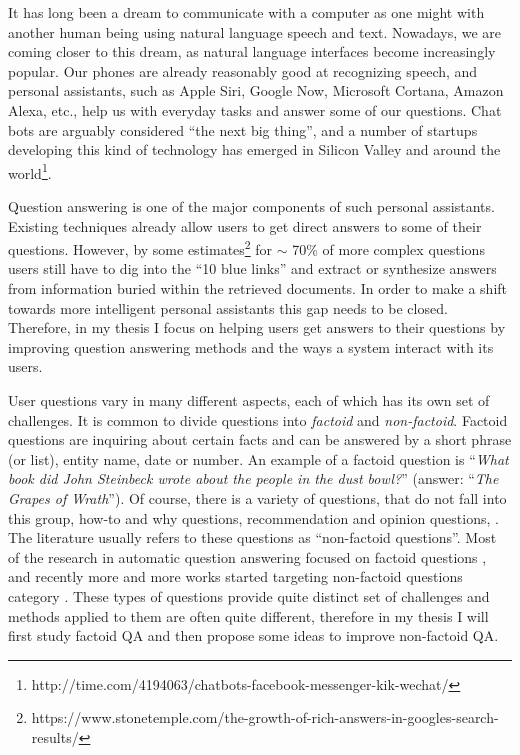 %
%
\label{chapter:intro}

\setcounter{page}{1}
\pagestyle{myheadings}

\noindent

It has long been a dream to communicate with a computer as one might with another human being using natural language speech and text.
Nowadays, we are coming closer to this dream, as natural language interfaces become increasingly popular.
Our phones are already reasonably good at recognizing speech, and personal assistants, such as Apple Siri, Google Now, Microsoft Cortana, Amazon Alexa, etc., help us with everyday tasks and answer some of our questions.
Chat bots are arguably considered ``the next big thing'', and a number of startups developing this kind of technology has emerged in Silicon Valley and around the world\footnote{http://time.com/4194063/chatbots-facebook-messenger-kik-wechat/}.

Question answering is one of the major components of such personal assistants.
Existing techniques already allow users to get direct answers to some of their questions.
However, by some estimates\footnote{https://www.stonetemple.com/the-growth-of-rich-answers-in-googles-search-results/} for $\sim$ 70\% of more complex questions users still have to dig into the ``10 blue links'' and extract or synthesize answers from information buried within the retrieved documents.
In order to make a shift towards more intelligent personal assistants this gap needs to be closed.
Therefore, in my thesis I focus on helping users get answers to their questions by improving question answering methods and the ways a system interact with its users.

User questions vary in many different aspects, each of which has its own set of challenges.
It is common to divide questions into \textit{factoid} and \textit{non-factoid}.
Factoid questions are inquiring about certain facts and can be answered by a short phrase (or list), \ie entity name, date or number.
An example of a factoid question is ``\textit{What book did John Steinbeck wrote about the people in the dust bowl?}'' (answer: ``\textit{The Grapes of Wrath}'').
Of course, there is a variety of questions, that do not fall into this group, \eg how-to and why questions, recommendation and opinion questions, \etc.
The literature usually refers to these questions as ``non-factoid questions''.
Most of the research in automatic question answering focused on factoid questions \cite{voorhees2001trec,lin2007exploration,BerantCFL13:sempre,Cafarella:2008:WEP:1453856.1453916}, and recently more and more works started targeting non-factoid questions category \cite{overviewliveqa15,surdeanu2011learning,fried2015higher,sharp2015spinning}.
These types of questions provide quite distinct set of challenges and methods applied to them are often quite different, therefore in my thesis I will first study factoid QA and then propose some ideas to improve non-factoid QA.

